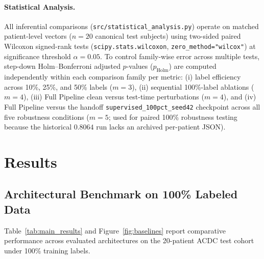 \documentclass[pdflatex,sn-mathphys]{sn-jnl}
\theoremstyle{thmstyleone}
\theoremstyle{thmstyletwo}
\theoremstyle{thmstylethree}
\begin{document}
\paragraph{Statistical Analysis.}
All inferential comparisons (\texttt{src/statistical\_analysis.py}) operate on matched patient-level vectors ($n = 20$ canonical test subjects) using two-sided paired Wilcoxon signed-rank tests (\texttt{scipy.stats.wilcoxon}, \texttt{zero\_method="wilcox"}) at significance threshold $\alpha = 0.05$. To control family-wise error across multiple tests, step-down Holm--Bonferroni adjusted $p$-values ($p_{\text{Holm}}$) are computed independently within each comparison family per metric: (i) label efficiency across 10\%, 25\%, and 50\% labels ($m = 3$), (ii) sequential 100\%-label ablations ($m = 4$), (iii) Full Pipeline clean versus test-time perturbations ($m = 4$), and (iv) Full Pipeline versus the handoff \texttt{supervised\_100pct\_seed42} checkpoint across all five robustness conditions ($m = 5$; used for paired 100\% robustness testing because the historical $0.8064$ run lacks an archived per-patient JSON).

\section{Results}\label{sec:results}

\subsection{Architectural Benchmark on 100\% Labeled Data}
Table~\ref{tab:main_results} and Figure~\ref{fig:baselines} report comparative performance across evaluated architectures on the 20-patient ACDC test cohort under 100\% training labels.
\end{document}
